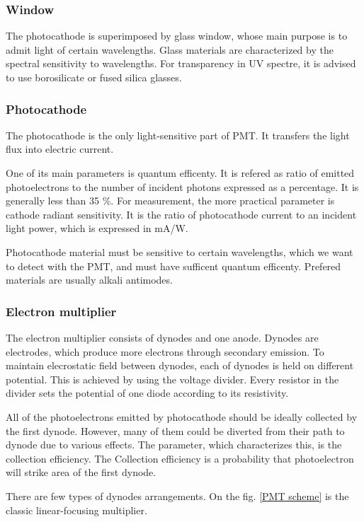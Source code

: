 \subsubsection{Window}

The photocathode is superimposed by glass window, whose main purpose is to admit light of certain wavelengths. Glass materials are characterized by the spectral sensitivity to wavelengths. For transparency in UV spectre, it is advised to use borosilicate or fused silica glasses.


\subsubsection{Photocathode}

The photocathode is the only light-sensitive part of PMT. It transfers the light flux into electric current.
\par
One of its main parameters is quantum efficenty. It is refered as ratio of emitted photoelectrons to the number of incident photons expressed as a percentage. It is generally less than 35 \%. For measurement, the more practical parameter is cathode radiant sensitivity. It is the ratio of photocathode current to an incident light power, which is expressed in mA/W.
\par
Photocathode material must be sensitive to certain wavelengths, which we want to detect with the PMT, and must have sufficent quantum efficenty. Prefered materials are usually alkali antimodes.
\subsubsection{Electron multiplier}
The electron multiplier consists of dynodes and one anode.
Dynodes are electrodes, which produce more electrons through secondary emission. To maintain elecrostatic field between dynodes, each of dynodes is held on different potential. This is achieved by using the voltage divider. Every resistor in the divider sets the potential of one diode according to its resistivity.
\par
All of the photoelectrons emitted by photocathode should be ideally collected by the first dynode. However, many of them could be diverted from their path to dynode due to various effects. The parameter, which characterizes this, is the collection efficiency. The Collection efficiency is a probability that photoelectron will strike area of the first dynode. 
\par
There are few types of dynodes arrangements. On the fig. \ref{PMT scheme} is the classic linear-focusing multiplier. 


